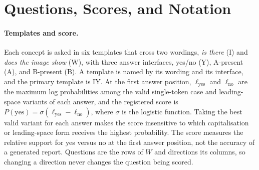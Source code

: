 \documentclass{article}
\begin{document}
\begin{table}[H]
\centering
\setlength{\tabcolsep}{5pt}
\caption{\textbf{Mass clinical competition across prompts.} Clinical margin per prompt: the Mass effect minus the largest of the five other clinical effects, in finding-present logit units. Top, the discovery crossover; bottom, the registered confirmation on new patients.}
\label{tab:seed-mass}
\end{table}

\FloatBarrier

\section{Questions, Scores, and Notation}
\label{app:protocol}

\paragraph{Templates and score.} Each concept is asked in six templates that cross two wordings, \emph{is there} (I) and \emph{does the image show} (W), with three answer interfaces, yes/no (Y), A-present (A), and B-present (B). A template is named by its wording and its interface, and the primary template is IY. At the first answer position, $\ell_{\mathrm{yes}}$ and $\ell_{\mathrm{no}}$ are the maximum log probabilities among the valid single-token case and leading-space variants of each answer, and the registered score is $P(\mathrm{yes})=\sigma(\ell_{\mathrm{yes}}-\ell_{\mathrm{no}})$, where $\sigma$ is the logistic function. Taking the best valid variant for each answer makes the score insensitive to which capitalisation or leading-space form receives the highest probability. The score measures the relative support for yes versus no at the first answer position, not the accuracy of a generated report. Questions are the rows of $W$ and directions its columns, so changing a direction never changes the question being scored.
\end{document}
